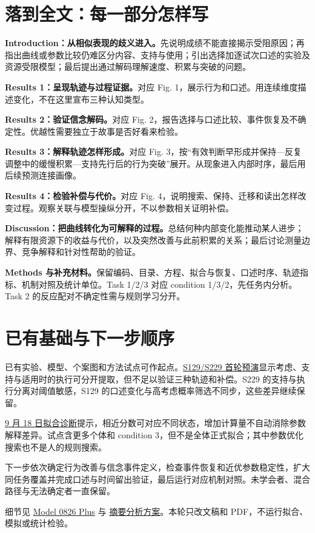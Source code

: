 \documentclass[12pt]{article}
\newcommand{\idea}[2]{\par\Needspace{3\baselineskip}\noindent\textbf{#1。}#2\par}
\begin{document}
\section{落到全文：每一部分怎样写}
\idea{Introduction：从相似表现的歧义进入}{先说明成绩不能直接揭示受阻原因；再指出曲线或参数比较仍难区分内容、支持与使用；引出选择加逐试次口述的实验及资源受限模型；最后提出通过解码理解速度、积累与突破的问题。}
\idea{Results 1：呈现轨迹与过程证据}{对应 Fig. 1，展示行为和口述。用连续维度描述变化，不在这里宣布三种认知类型。}
\idea{Results 2：验证信念解码}{对应 Fig. 2，报告选择与口述比较、事件恢复及不确定性。优越性需要独立于故事是否好看来检验。}
\idea{Results 3：解释轨迹怎样形成}{对应 Fig. 3，按“有效判断早形成并保持—反复调整中的缓慢积累—支持先行后的行为突破”展开。从现象进入内部时序，最后用后续预测连接画像。}
\idea{Results 4：检验补偿与代价}{对应 Fig. 4，说明搜索、保持、迁移和读出怎样改变过程。观察关联与模型操纵分开，不以参数相关证明补偿。}
\idea{Discussion：把曲线转化为可解释的过程}{总结何种内部变化能推动某人进步；解释有限资源下的收益与代价，以及突然改善与此前积累的关系；最后讨论测量边界、竞争解释和针对性帮助的验证。}
\idea{Methods 与补充材料}{保留编码、目录、方程、拟合与恢复、口述时序、轨迹指标、机制对照及统计单位。Task 1/2/3 对应 condition 1/3/2，先任务内分析。Task 2 的反应配对不确定性需与规则学习分开。}

\section{已有基础与下一步顺序}
已有实验、模型、个案图和方法试点可作起点。\href{../../../../CategoryLearning_codes/figures/outputs/fig3/bottleneck_cases_20260917_v2/README.md}{S129/S229 首轮预演}显示考虑、支持与适用时的执行可分开提取，但不足以验证三种轨迹和补偿。S229 的支持与执行分离对阈值敏感，S129 的口述变化与高考虑概率筛选不同步，这些差异继续保留。

\href{../../../../results/model_0826/search_stopping_pilot_20260918/README.md}{9 月 18 日拟合诊断}提示，相近分数可对应不同状态，增加计算量不自动消除参数解释差异。试点含更多个体和 condition 3，但不是全体正式拟合；其中参数优化搜索也不是人的规则搜索。

下一步依次确定行为改善与信念事件定义，检查事件恢复和近优参数稳定性，扩大同任务覆盖并完成口述与时间留出验证，最后运行对应机制对照。未学会者、混合路径与无法确定者一直保留。

细节见 \href{model_0826_plus.pdf}{Model 0826 Plus} 与 \href{model_0826_bottlenecks_analysis_plan_20260917.md}{摘要分析方案}。本轮只改文稿和 PDF，不运行拟合、模拟或统计检验。
\end{document}
